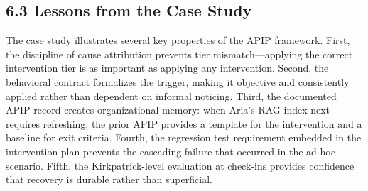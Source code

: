 \subsection{6.3  Lessons from the Case Study}

The case study illustrates several key properties of the APIP framework. First, the discipline of cause attribution prevents tier mismatch---applying the correct intervention tier is as important as applying any intervention. Second, the behavioral contract formalizes the trigger, making it objective and consistently applied rather than dependent on informal noticing. Third, the documented APIP record creates organizational memory: when Aria's RAG index next requires refreshing, the prior APIP provides a template for the intervention and a baseline for exit criteria. Fourth, the regression test requirement embedded in the intervention plan prevents the cascading failure that occurred in the ad-hoc scenario. Fifth, the Kirkpatrick-level evaluation at check-ins provides confidence that recovery is durable rather than superficial.

